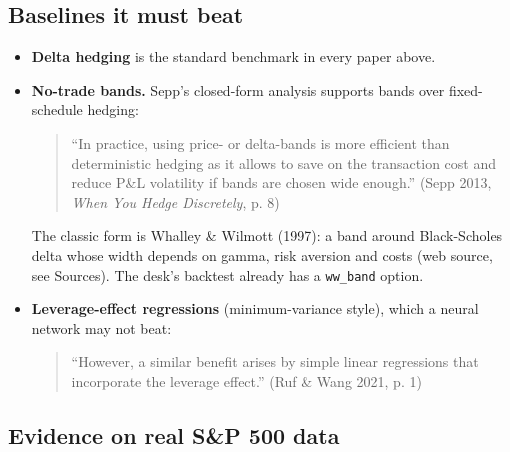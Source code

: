 \documentclass{article}
\begin{document}
\subsection{Baselines it must beat}

\begin{itemize}

\item \textbf{Delta hedging} is the standard benchmark in every paper above.

\item \textbf{No-trade bands.} Sepp's closed-form analysis supports bands over fixed-schedule hedging:

\begin{quote}``In practice, using price- or delta-bands is more efficient than deterministic hedging as it allows to save on the transaction cost and reduce P\&L volatility if bands are chosen wide enough.'' (Sepp 2013, \emph{When You Hedge Discretely}, p. 8)\end{quote}

The classic form is Whalley \& Wilmott (1997): a band around Black-Scholes delta whose width depends on gamma, risk aversion and costs (web source, see Sources). The desk's backtest already has a \texttt{ww\_\allowbreak{}band} option.

\item \textbf{Leverage-effect regressions} (minimum-variance style), which a neural network may not beat:

\begin{quote}``However, a similar benefit arises by simple linear regressions that incorporate the leverage effect.'' (Ruf \& Wang 2021, p. 1)\end{quote}

\end{itemize}

\subsection{Evidence on real S\&P 500 data}
\end{document}
